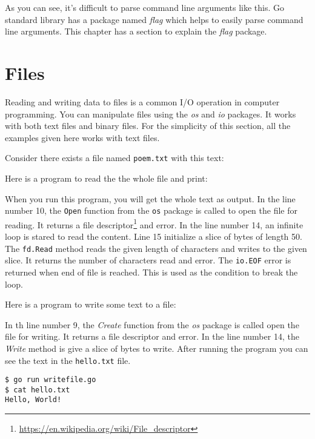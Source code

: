 As you can see, it's difficult to parse command line arguments like this. Go
standard library has a package named \textit{flag} which helps to easily parse
command line arguments. This chapter has a section to explain the \textit{flag}
package.

\section{Files}

Reading and writing data to files is a common I/O operation in computer
programming. You can manipulate files using the \textit{os} and \textit{io}
packages. It works with both text files and binary files. For the simplicity of
this section, all the examples given here works with text files.

Consider there exists a file named \texttt{poem.txt} with this text:



Here is a program to read the the whole file and print:



When you run this program, you will get the whole text as output. In the line
number 10, the \texttt{Open} function from the \texttt{os} package is called to open
the file for reading. It returns a file
descriptor\footnote{\url{https://en.wikipedia.org/wiki/File_descriptor}} and
error. In the line number 14, an infinite loop is stared to read the content.
Line 15 initialize a slice of bytes of length 50. The \texttt{fd.Read} method
reads the given length of characters and writes to the given slice. It returns
the number of characters read and error. The \texttt{io.EOF} error is returned
when end of file is reached. This is used as the condition to break the loop.

Here is a program to write some text to a file:



In th line number 9, the \textit{Create} function from the \textit{os} package
is called open the file for writing. It returns a file descriptor and error. In
the line number 14, the \textit{Write} method is give a slice of bytes to write.
After running the program you can see the text in the \texttt{hello.txt} file.

\begin{lstlisting}[numbers=none]
$ go run writefile.go
$ cat hello.txt
Hello, World!
\end{lstlisting}

